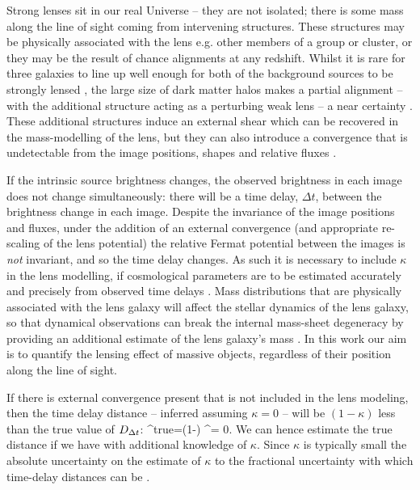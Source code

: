 \documentclass[useAMS,usenatbib]{mn2e}
\begin{document}
Strong lenses sit in our real Universe -- they are not \truely isolated;
there is some mass along the line of sight coming from intervening
structures. These structures may be physically associated with the lens
e.g. other members of a group or cluster, or they may be the result of
chance alignments at any redshift.  Whilst it is rare for three galaxies
to line up well enough for both of the background sources to be strongly
lensed \citep{GavazziEtal2008,CollettEtal2012a}, the large size of dark
matter halos makes a partial alignment -- with the additional structure
acting as a perturbing weak lens --  a near certainty
\citep{Vale+White2003,HilbertEtal2007}. These additional structures
induce an external shear which can be recovered in the mass-modelling of
the lens, but they can also introduce a convergence that is undetectable
from the image positions, shapes and relative fluxes
\citep{FalcoEtal1985}.

If the intrinsic source brightness changes, the observed brightness in
each image does not change simultaneously: there will be a time delay,
$\Delta t$, between the brightness change in each image. Despite the
invariance of the image positions and fluxes, under the addition of an
external convergence (and appropriate re-scaling of the lens potential)
the relative Fermat potential between the images is {\it not} invariant,
and so the time delay changes. As such it is necessary to include
$\kappa$ in the lens modelling, if cosmological parameters are to be
estimated accurately and precisely from observed time delays
\citep{SuyuEtal2010}. Mass distributions that are physically associated with the lens galaxy
will affect the stellar dynamics of the lens galaxy, so that dynamical
observations can break the internal mass-sheet degeneracy by providing
an additional estimate of the lens galaxy's mass
\citep[e.g.,][]{SuyuEtal2010}. In this work our aim is to quantify the
lensing effect of massive objects, regardless of their position along
the line of sight.

If there is external convergence present that is not included in the
lens modeling, then the time delay distance -- inferred assuming $\kappa
= 0$ -- will be $(1-\kappa)$ less than the true value of $D_{\Delta t}$:
\be 
\label{eq:MassSheet:Dtbias}
\Dt^{\rm{true}}=(1-\kappa) \Dt^{{\kappax = 0}}.
\ee
We can hence estimate the true distance if we have  with additional
knowledge of $\kappa$. Since $\kappa$ is typically small the absolute
uncertainty on the estimate of $\kappa$ \correspends to the fractional
uncertainty with which time-delay distances can be \infered.
\end{document}
